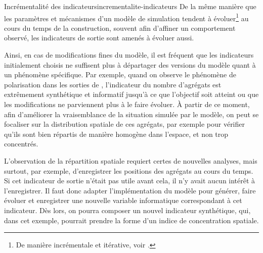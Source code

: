 \bigskip
\begin{encadre}{Incrémentalité des indicateurs}{incrementalite-indicateurs}
\renewcommand{\thempfootnote}{\alph{mpfootnote}}
De la même manière que les paramètres et mécanismes d'un modèle de simulation tendent à évoluer\footnote{
	De manière incrémentale et itérative, voir \textcite[\url{http://itsadeliverything.com/revisiting-the-iterative-incremental-mona-lisa}]{thomas_revisiting_2012}.
} au cours du temps de la construction, souvent afin d'affiner un comportement observé, les indicateurs de sortie sont amenés à évoluer aussi.

Ainsi, en cas de modifications fines du modèle, il est fréquent que les indicateurs initialement choisis ne suffisent plus à départager des versions du modèle quant à un phénomène spécifique.
Par exemple, quand on observe le phénomène de polarisation dans les sorties de \simfeodal{}, l'indicateur du nombre d'agrégats est extrêmement synthétique et informatif jusqu'à ce que l'objectif soit atteint ou que les modifications ne parviennent plus à le faire évoluer.
À partir de ce moment, afin d'améliorer la vraisemblance de la situation simulée par le modèle, on peut se focaliser sur la distribution spatiale de ces agrégats, par exemple pour vérifier qu'ils sont bien répartis de manière homogène dans l'espace, et non trop concentrés.

L'observation de la répartition spatiale requiert certes de nouvelles analyses, mais surtout, par exemple, d'enregistrer les positions des agrégats au cours du temps.
Si cet indicateur de sortie n'était pas utile avant cela, il n'y avait aucun intérêt à l'enregistrer.
Il faut donc adapter l'implémentation du modèle pour générer, faire évoluer et enregistrer une nouvelle variable informatique correspondant à cet indicateur.
Dès lors, on pourra composer un nouvel indicateur synthétique, qui, dans cet exemple, pourrait prendre la forme d'un indice de concentration spatiale.


\end{encadre}
